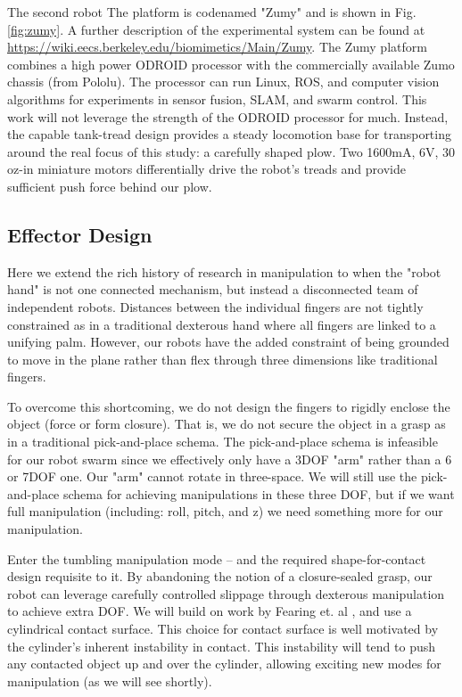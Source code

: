 \documentclass[a4paper]{article}
\begin{document}
The second robot The platform is codenamed "Zumy" and is shown in Fig. \ref{fig:zumy}.
A further description of the experimental system can be found at \url{https://wiki.eecs.berkeley.edu/biomimetics/Main/Zumy}.
The Zumy platform combines a high power ODROID processor with the commercially available Zumo chassis (from Pololu).
The processor can run Linux, ROS, and computer vision algorithms for experiments in sensor fusion, SLAM, and swarm control.
This work will not leverage the strength of the ODROID processor for much.
Instead, the capable tank-tread design provides a steady locomotion base for transporting around the real focus of this study: a carefully shaped plow.
Two 1600mA, 6V, 30 oz-in miniature motors differentially drive the robot's treads and provide sufficient push force behind our plow.

\subsection{Effector Design}

Here we extend the rich history of research in manipulation to when the "robot hand" is not one connected mechanism, but instead a disconnected team of independent robots.
Distances between the individual fingers are not tightly constrained as in a traditional dexterous hand where all fingers are linked to a unifying palm.
However, our robots have the added constraint of being grounded to move in the plane rather than flex through three dimensions like traditional fingers.

To overcome this shortcoming, we do not design the fingers to rigidly enclose the object (force or form closure).
That is, we do not secure the object in a grasp as in a traditional pick-and-place schema.
The pick-and-place schema is infeasible for our robot swarm since we effectively only have a 3DOF "arm" rather than a 6 or 7DOF one. Our "arm" cannot rotate in three-space.
We will still use the pick-and-place schema for achieving manipulations in these three DOF, but if we want full manipulation (including: roll, pitch, and z) we need something more for our manipulation.

Enter the tumbling manipulation mode -- and the required shape-for-contact design requisite to it.
By abandoning the notion of a closure-sealed grasp, our robot can leverage carefully controlled slippage through dexterous manipulation to achieve extra DOF.
We will build on work by Fearing et. al \cite{fearing1986simplified}, and use a cylindrical contact surface.
This choice for contact surface is well motivated by the cylinder's inherent instability in contact.
This instability will tend to push any contacted object up and over the cylinder, allowing exciting new modes for manipulation (as we will see shortly).
\end{document}
